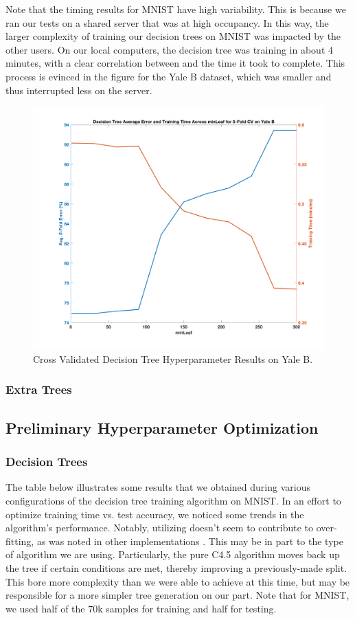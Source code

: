 Note that the timing results for MNIST have high variability. This is because we ran our tests on a shared server that was at high occupancy. In this way, the larger complexity of training our decision trees on MNIST was impacted by the other users. On our local computers, the decision tree was training in about 4 minutes, with a clear correlation between  and the time it took to complete. This process is evinced in the figure for the Yale B dataset, which was smaller and thus interrupted less on the server.
%
\begin{figure}[H]
  \centering\includegraphics[width=0.6\columnwidth]{../images/cv_dt_yaleb}
  \caption{Cross Validated Decision Tree Hyperparameter Results on Yale B.}
\end{figure}

\subsubsection{Extra Trees}

\iffalse
\subsection{Preliminary Hyperparameter Optimization}

\subsubsection{Decision Trees}

The table below illustrates some results that we obtained during various configurations of the decision tree training algorithm on MNIST. In an effort to optimize training time vs. test accuracy, we noticed some trends in the algorithm's performance. Notably, utilizing  doesn't seem to contribute to over-fitting, as was noted in other implementations \cite{matlab:fitctree}. This may be in part to the type of algorithm we are using. Particularly, the pure C4.5 algorithm moves back up the tree if certain conditions are met, thereby improving a previously-made split. This bore more complexity than we were able to achieve at this time, but may be responsible for a more simpler tree generation on our part. Note that for MNIST, we used half of the 70k samples for training and half for testing.

